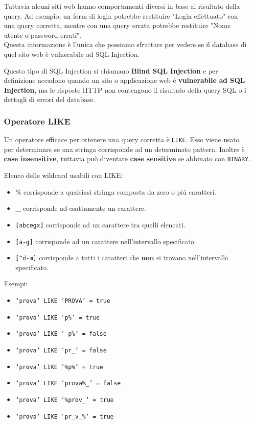 \documentclass{article}
\begin{document}
Tuttavia alcuni siti web hanno comportamenti diversi in base al risultato della query. Ad esempio, un form di login potrebbe restituire "Login effettuato" con una query corretta, mentre con una query errata potrebbe restituire "Nome utente o password errati".\\
Questa informazione è l'unica che possiamo sfruttare per vedere se il database di quel sito web è vulnerabile ad SQL Injection.

Questo tipo di SQL Injection si chiamano \textbf{Blind SQL Injection} e per definizione accadono quando un sito o applicazione web è \textbf{vulnerabile ad SQL Injection}, ma le risposte HTTP non contengono il risultato della query SQL o i dettagli di errori del database.

\subsubsection{Operatore LIKE}
Un operatore efficace per ottenere una query corretta è \verb|LIKE|.
Esso viene usato per determinare se una stringa corrisponde ad un determinato pattern. Inoltre è \textbf{case insensitive}, tuttavia può diventare \textbf{case sensitive} se abbinato con \verb|BINARY|.

Elenco delle wildcard usabili con LIKE:
\begin{itemize}
	\item \% corrisponde a qualsiasi stringa composta da zero o più caratteri.
	\item \_ corrisponde ad esattamente un carattere.
	\item \verb|[abcegx]| corrisponde ad un carattere tra quelli elencati.
	\item \verb|[a-g]| corrisponde ad un carattere nell’intervallo specificato 
	\item \verb|[^d-m]| corrisponde a tutti i caratteri che \textbf{non} si trovano nell’intervallo specificato.
\end{itemize}

Esempi:
\begin{itemize}
	\item \verb|‘prova’ LIKE ‘PROVA’ = true|
	\item \verb|‘prova’ LIKE ‘p%’ = true|
	\item \verb|‘prova’ LIKE ‘_p%’ = false|
	\item \verb|‘prova’ LIKE ‘pr_’ = false|
	\item \verb|‘prova’ LIKE ‘%p%’ = true|
	\item \verb|‘prova’ LIKE ‘prova%_’ = false|
	\item \verb|‘prova’ LIKE ‘%prov_’ = true|
	\item \verb|‘prova’ LIKE ‘pr_v_%’ = true|
\end{itemize}
\end{document}
